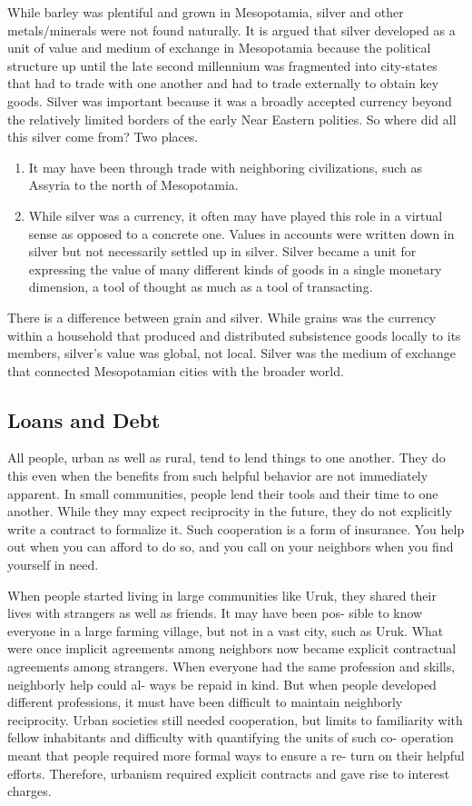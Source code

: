 \documentclass{article}
\begin{document}
    While barley was plentiful and grown in Mesopotamia, silver and other metals/minerals were not found naturally. It is argued that silver developed as a unit of value and medium of exchange in Mesopotamia because the political structure up until the late second millennium was fragmented into city-states that had to trade with one another and had to trade externally to obtain key goods. Silver was important because it was a broadly accepted currency beyond the relatively limited borders of the early Near Eastern polities. So where did all this silver come from? Two places. 
    \begin{enumerate}
      \item It may have been through trade with neighboring civilizations, such as Assyria to the north of Mesopotamia. 
      \item While silver was a currency, it often may have played this role in a virtual sense as opposed to a concrete one. Values in accounts were written down in silver but not necessarily settled up in silver. Silver became a unit for expressing the value of many different kinds of goods in a single monetary dimension, a tool of thought as much as a tool of transacting. 
    \end{enumerate}

    There is a difference between grain and silver. While grains was the currency within a household that produced and distributed subsistence goods locally to its members, silver's value was global, not local. Silver was the medium of exchange that connected Mesopotamian cities with the broader world. 

  \subsection{Loans and Debt}
    
    All people, urban as well as rural, tend to lend things to one another. They do this even when the benefits from such helpful behavior are not immediately apparent. In small communities, people lend their tools and their time to one another. While they may expect reciprocity in the future, they do not explicitly write a contract to formalize it. Such cooperation is a form of insurance. You help out when you can afford to do so, and you call on your neighbors when you find yourself in need.

    When people started living in large communities like Uruk, they shared their lives with strangers as well as friends. It may have been pos- sible to know everyone in a large farming village, but not in a vast city, such as Uruk. What were once implicit agreements among neighbors now became explicit contractual agreements among strangers. When everyone had the same profession and skills, neighborly help could al- ways be repaid in kind. But when people developed different professions, it must have been difficult to maintain neighborly reciprocity. Urban societies still needed cooperation, but limits to familiarity with fellow inhabitants and difficulty with quantifying the units of such co- operation meant that people required more formal ways to ensure a re- turn on their helpful efforts. Therefore, urbanism required explicit contracts and gave rise to interest charges. 
    
\end{document}
